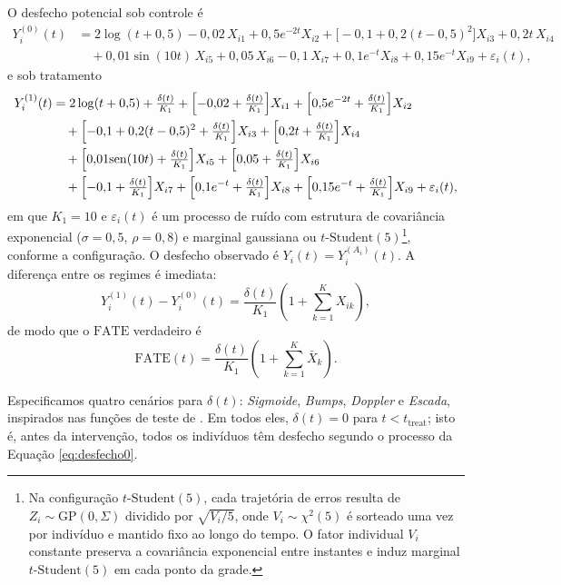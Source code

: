 O desfecho potencial sob controle é
\begin{align}
Y_i^{(0)}(t) &= 2\log(t + 0{,}5)
	- 0{,}02\, X_{i1}
	+ 0{,}5 e^{-2t} X_{i2}
	+ \bigl[-0{,}1 + 0{,}2(t - 0{,}5)^2\bigr] X_{i3}
	+ 0{,}2t\, X_{i4} \nonumber\\
&\quad + 0{,}01\sin(10t)\, X_{i5}
	+ 0{,}05\, X_{i6}
	- 0{,}1\, X_{i7}
	+ 0{,}1 e^{-t} X_{i8}
	+ 0{,}15 e^{-t} X_{i9}
	+ \varepsilon_i(t), \label{eq:desfecho0}
\end{align}
e sob tratamento
\begin{align}
Y_i^{(1)}(t) &= 2\log(t + 0{,}5) + \tfrac{\delta(t)}{K_1}
	+ \Bigl[-0{,}02 + \tfrac{\delta(t)}{K_1}\Bigr] X_{i1}
	+ \Bigl[0{,}5 e^{-2t} + \tfrac{\delta(t)}{K_1}\Bigr] X_{i2} \nonumber\\
&\quad + \Bigl[-0{,}1 + 0{,}2(t - 0{,}5)^2 + \tfrac{\delta(t)}{K_1}\Bigr] X_{i3}
	+ \Bigl[0{,}2t + \tfrac{\delta(t)}{K_1}\Bigr] X_{i4} \nonumber\\
&\quad + \Bigl[0{,}01\sin(10t) + \tfrac{\delta(t)}{K_1}\Bigr] X_{i5}
	+ \Bigl[0{,}05 + \tfrac{\delta(t)}{K_1}\Bigr] X_{i6} \nonumber\\
&\quad + \Bigl[-0{,}1 + \tfrac{\delta(t)}{K_1}\Bigr] X_{i7}
	+ \Bigl[0{,}1 e^{-t} + \tfrac{\delta(t)}{K_1}\Bigr] X_{i8}
	+ \Bigl[0{,}15 e^{-t} + \tfrac{\delta(t)}{K_1}\Bigr] X_{i9}
	+ \varepsilon_i(t), \label{eq:desfecho1}
\end{align}
em que \(K_1 = 10\) e \(\varepsilon_i(t)\) é um processo de ruído com estrutura de covariância exponencial (\(\sigma = 0{,}5\), \(\rho = 0{,}8\)) e marginal gaussiana ou \(t\text{-Student}(5)\)\footnote{Na configuração \(t\text{-Student}(5)\), cada trajetória de erros resulta de \(Z_i \sim \mathrm{GP}(0,\Sigma)\) dividido por \(\sqrt{V_i/5}\), onde \(V_i \sim \chi^2(5)\) é sorteado uma vez por indivíduo e mantido fixo ao longo do tempo. O fator individual \(V_i\) constante preserva a covariância exponencial entre instantes e induz marginal \(t\text{-Student}(5)\) em cada ponto da grade.}, conforme a configuração. 
O desfecho observado é \(Y_i(t) = Y_i^{(A_i)}(t)\). 
A diferença entre os regimes é imediata:
\[
	Y_i^{(1)}(t) - Y_i^{(0)}(t) = \frac{\delta(t)}{K_1}\!\left(1 + \sum_{k=1}^{K} X_{ik}\right),
\]
de modo que o \(\mathrm{FATE}\) verdadeiro é
\[
	\mathrm{FATE}(t) = \frac{\delta(t)}{K_1}\!\left(1 + \sum_{k=1}^{K} \bar{X}_k\right).
\]

Especificamos quatro cenários para \(\delta(t)\): \emph{Sigmoide}, \emph{Bumps}, \emph{Doppler} e \emph{Escada}, inspirados nas funções de teste de . 
Em todos eles, \(\delta(t) = 0\) para \(t < t_{\mathrm{treat}}\); isto é, antes da intervenção, todos os indivíduos têm desfecho segundo o processo da Equação \ref{eq:desfecho0}.

